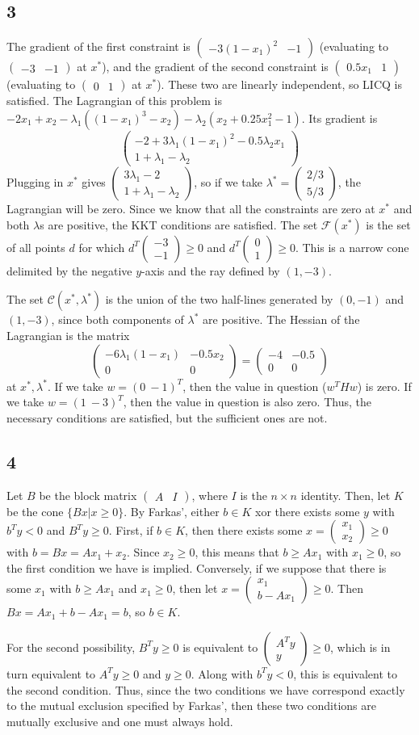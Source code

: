 \documentclass{article}
\newcommand{\openm}{\begin{pmatrix}}
\newcommand{\closem}{\end{pmatrix}}
\begin{document}
\subsection*{3}
The gradient of the first constraint is $\openm-3(1-x_1)^2&-1\closem$ (evaluating to $\openm -3&-1\closem$ at $x^*$), and the gradient of the second constraint is $\openm0.5x_1&1\closem$ (evaluating to $\openm 0&1\closem$ at $x^*$). These two are linearly independent, so LICQ is satisfied.
The Lagrangian of this problem is $-2x_1+x_2-\lambda_1((1-x_1)^3-x_2)-\lambda_2(x_2+0.25x_1^2-1)$. Its gradient is
\[\openm-2+3\lambda_1(1-x_1)^2-0.5\lambda_2x_1\\1+\lambda_1-\lambda_2\closem\]
Plugging in $x^*$ gives $\openm 3\lambda_1-2\\1+\lambda_1-\lambda_2\closem$, so if we take $\lambda^*=\openm2/3\\5/3\closem$, the Lagrangian will be zero. Since we know that all the constraints are zero at $x^*$ and both $\lambda$s are positive, the KKT conditions are satisfied.
The set $\mathscr{F}(x^*)$ is the set of all points $d$ for which $d^T\openm-3\\-1\closem\geq0$ and $d^T\openm0\\1\closem\geq0$. This is a narrow cone delimited by the negative $y$-axis and the ray defined by $(1,-3)$. 

The set $\mathscr{C}(x^*, \lambda^*)$ is the union of the two half-lines generated by $(0, -1)$ and $(1, -3)$, since both components of $\lambda^*$ are positive.
The Hessian of the Lagrangian is the matrix
\[\openm -6\lambda_1(1-x_1)&-0.5x_2\\0&0\closem=\openm-4&-0.5\\0&0\closem\]
at $x^*, \lambda^*$. 
If we take $w=(0\ -1)^T$, then the value in question ($w^THw$) is zero. If we take $w=(1\ -3)^T$, then the value in question is also zero. Thus, the necessary conditions are satisfied, but the sufficient ones are not.
\subsection*{4}
Let $B$ be the block matrix $\openm A&I\closem$, where $I$ is the $n\times n$ identity. Then, let $K$ be the cone $\{Bx|x\geq0\}$. By Farkas', either $b\in K$ xor there exists some $y$ with $b^Ty<0$ and $B^Ty\geq0$. First, if $b\in K$, then there exists some $x=\openm x_1\\x_2\closem\geq0$ with $b=Bx=Ax_1+x_2$. Since $x_2\geq0$, this means that $b\geq Ax_1$ with $x_1\geq0$, so the first condition we have is implied. Conversely, if we suppose that there is some $x_1$ with $b\geq Ax_1$ and $x_1\geq0$, then let $x=\openm x_1\\b-Ax_1\closem\geq0$. Then $Bx=Ax_1+b-Ax_1=b$, so $b\in K$. 

For the second possibility, $B^Ty\geq0$ is equivalent to $\openm A^Ty\\y\closem\geq0$, which is in turn equivalent to $A^Ty\geq0$ and $y\geq0$. Along with $b^Ty<0$, this is equivalent to the second condition. Thus, since the two conditions we have correspond exactly to the mutual exclusion specified by Farkas', then these two conditions are mutually exclusive and one must always hold.
\end{document}
